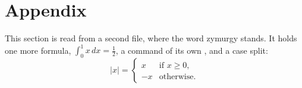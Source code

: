 \section{Appendix}\label{sec:appendix}

This section is read from a second file, where the word zymurgy stands. It holds
one more formula, $\int_0^1 x\,dx = \tfrac12$, a command of its own , and a case split:
\[
  |x| = \begin{cases} x & \text{if } x \ge 0, \\ -x & \text{otherwise.} \end{cases}
\]
